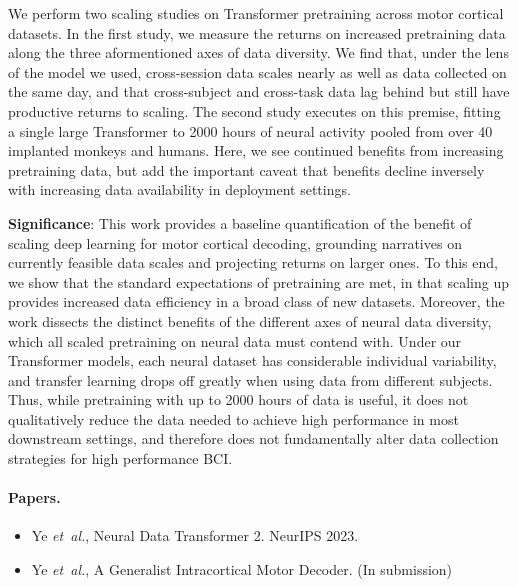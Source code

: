 \documentclass[12pt,oneside]{report}
\DeclareRobustCommand{\etal}{\emph{et~al.}\xspace}
\begin{document}
We perform two scaling studies on Transformer pretraining across motor cortical datasets. In the first study, we measure the returns on increased pretraining data along the three aformentioned axes of data diversity. We find that, under the lens of the model we used, cross-session data scales nearly as well as data collected on the same day, and that cross-subject and cross-task data lag behind but still have productive returns to scaling. The second study executes on this premise, fitting a single large Transformer to 2000 hours of neural activity pooled from over 40 implanted monkeys and humans. Here, we see continued benefits from increasing pretraining data, but add the important caveat that benefits decline inversely with increasing data availability in deployment settings.

\textbf{Significance}: This work provides a baseline quantification of the benefit of scaling deep learning for motor cortical decoding, grounding narratives on currently feasible data scales and projecting returns on larger ones. To this end, we show that the standard expectations of pretraining are met, in that scaling up provides increased data efficiency in a broad class of new datasets. Moreover, the work dissects the distinct benefits of the different axes of neural data diversity, which all scaled pretraining on neural data must contend with. Under our Transformer models, each neural dataset has considerable individual variability, and transfer learning drops off greatly when using data from different subjects. Thus, while pretraining with up to 2000 hours of data is useful, it does not qualitatively reduce the data needed to achieve high performance in most downstream settings, and therefore does not fundamentally alter data collection strategies for high performance BCI.

\paragraph{Papers.}
\begin{itemize}
  \item Ye \etal, Neural Data Transformer 2. NeurIPS 2023.
  \item Ye \etal, A Generalist Intracortical Motor Decoder. (In submission)
\end{itemize}
\end{document}
